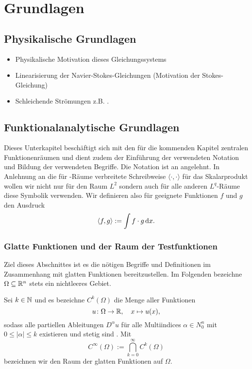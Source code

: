 \chapter{Grundlagen}
\label{cp:grundlagen}

\section{Physikalische Grundlagen}

\begin{itemize}
  \item Physikalische Motivation dieses Gleichungssystems
  \item Linearisierung der Navier-Stokes-Gleichungen (Motivation der Stokes-Gleichung)
  \item Schleichende Strömungen z.B. \cite[S.112,S.489]{spurk10stroemungslehre}. 
\end{itemize}

\section{Funktionalanalytische Grundlagen}

Dieses Unterkapitel beschäftigt sich mit den für die kommenden Kapitel zentralen Funktionenräumen und dient zudem der Einführung der verwendeten Notation und Bildung der verwendeten Begriffe.
Die Notation ist an \cite{sohr2001navier} angelehnt.
In Anlehnung an die für \hilbert\hyp{}Räume verbreitete Schreibweise $\langle \cdot, \cdot \rangle$ für das Skalarprodukt wollen wir nicht nur für den Raum $L^2$ sondern auch für alle anderen $L^q$\hyp{}Räume diese Symbolik verwenden.
Wir definieren also für geeignete Funktionen $f$ und $g$ den Ausdruck
$$
\langle f, g \rangle := \int f \cdot g \, {\operatorname{d}\!{x}}.
$$


\subsection{Glatte Funktionen und der Raum der Testfunktionen}
\label{subsec:smooth}

Ziel dieses Abschnittes ist es die nötigen Begriffe und Definitionen im Zusammenhang mit glatten Funktionen bereitzustellen.
Im Folgenden bezeichne $\Omega \subseteq \mathbb{R}^n$ stets ein nichtleeres Gebiet.

Sei $k \in \mathbb{N}$ und es bezeichne $C^k(\Omega)$ die Menge aller Funktionen
$$
u \colon \Omega \to \mathbb{R}, \quad x \mapsto u(x),
$$
sodass alle partiellen Ableitungen $D^\alpha u$ für alle Multiindices $\alpha \in N_0^n$ mit $0 \leq |\alpha| \leq k$ existieren und stetig sind . Mit
$$
  C^\infty(\Omega) := \bigcap_{k = 0}^\infty C^k(\Omega)
$$
bezeichnen wir den Raum der glatten Funktionen auf $\Omega$.

